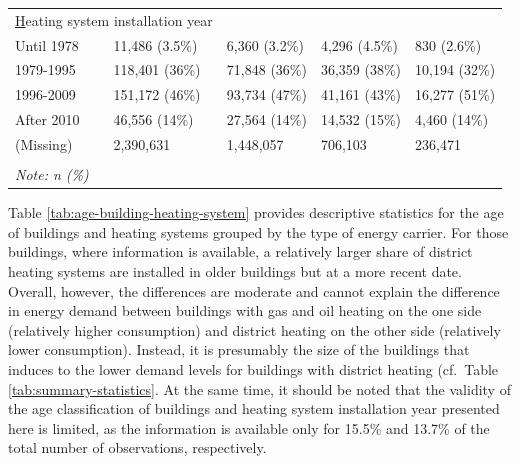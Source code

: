 \documentclass[12pt,twoside]{reedthesis}
\begin{document}
\begin{table}[]
{\begin{tabular}{@{}lllll@{}}
\multicolumn{2}{l}{{\ul Heating system installation year}} &                 &               &               \\
Until 1978                            & 11,486 (3.5\%)     & 6,360 (3.2\%)   & 4,296 (4.5\%) & 830 (2.6\%)   \\
1979-1995                             & 118,401 (36\%)     & 71,848 (36\%)   & 36,359 (38\%) & 10,194 (32\%) \\
1996-2009                             & 151,172 (46\%)     & 93,734 (47\%)   & 41,161 (43\%) & 16,277 (51\%) \\
After 2010                            & 46,556 (14\%)      & 27,564 (14\%)   & 14,532 (15\%) & 4,460 (14\%)  \\
(Missing)                             & 2,390,631          & 1,448,057       & 706,103       & 236,471       \\
                                      &                    &                 &               &               \\ \midrule
\textit{Note: n (\%)}                 &                    &                 &               &               \\ \bottomrule
\end{tabular}%
}
\end{table}
\noindent
Table \ref{tab:age-building-heating-system} provides descriptive statistics for the age of buildings and heating systems grouped by the type of energy carrier. For those buildings, where information is available, a relatively larger share of district heating systems are installed in older buildings but at a more recent date. Overall, however, the differences are moderate and cannot explain the difference in energy demand between buildings with gas and oil heating on the one side (relatively higher consumption) and district heating on the other side (relatively lower consumption). Instead, it is presumably the size of the buildings that induces to the lower demand levels for buildings with district heating (cf.~Table \ref{tab:summary-statistics}. At the same time, it should be noted that the validity of the age classification of buildings and heating system installation year presented here is limited, as the information is available only for 15.5\% and 13.7\% of the total number of observations, respectively.
\end{document}
